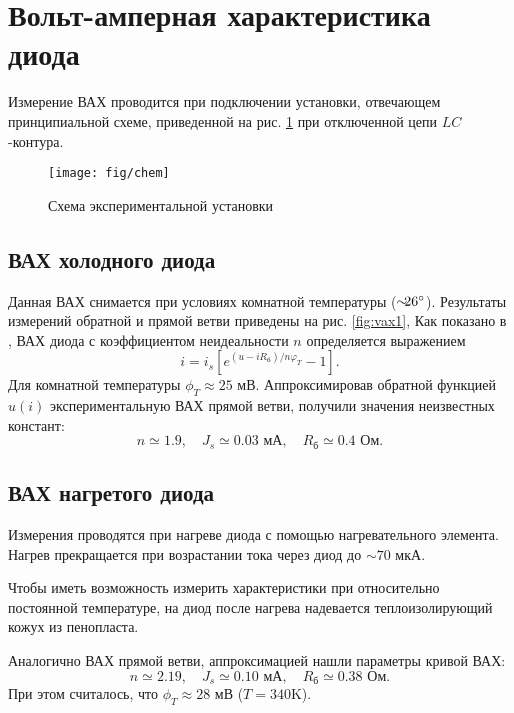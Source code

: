 \documentclass[a4paper,14pt]{extarticle}
\begin{document}
\newpage


\section{Вольт-амперная характеристика диода}
Измерение ВАХ проводится при подключении установки, отвечающем принципиальной схеме, приведенной на рис. \ref{fig:chem} при отключенной цепи $LC$-контура. 

\begin{figure}[h!]
	\centering
	\texttt{[image: fig/chem]}
	\caption{Схема экспериментальной установки}
	\label{fig:chem}
\end{figure}


\subsection{ВАХ холодного диода}
Данная ВАХ снимается при условиях комнатной температуры ($\sim\hspace{-0.5em}26^\circ$). Результаты измерений обратной и прямой ветви приведены на рис. \ref{fig:vax1}, 
Как показано в \cite[стр. 15]{met}, ВАХ диода с коэффициентом неидеальности $n$ определяется выражением
\begin{equation}
    i=i_s[e^{(u-iR_{\text{б}})/n \varphi_T}-1].
    \label{eq:id}
\end{equation}
Для комнатной температуры $\phi_T\approx 25$ мВ. Аппроксимировав обратной функцией $u(i)$ экспериментальную ВАХ прямой ветви, получили значения неизвестных констант:
\begin{equation}
    n \simeq 1.9,\quad J_s \simeq 0.03  \text{ мА},\quad R_{\text{б}} \simeq 0.4 \text{ Ом}.
\end{equation}



\subsection{ВАХ нагретого диода}


Измерения проводятся при нагреве диода с помощью нагревательного элемента. Нагрев прекращается при возрастании тока через диод до $\sim70$ мкА. 

Чтобы иметь возможность измерить характеристики при относительно постоянной температуре, на диод после нагрева надевается теплоизолирующий кожух из пенопласта.

Аналогично ВАХ прямой ветви, аппроксимацией нашли параметры кривой ВАХ:
\begin{equation}
    n \simeq 2.19,\quad J_s \simeq 0.10  \text{ мА},\quad R_{\text{б}} \simeq 0.38 \text{ Ом}.
\end{equation}
При этом считалось, что $\phi_T\approx28$ мВ ($T=340$K).
\end{document}
